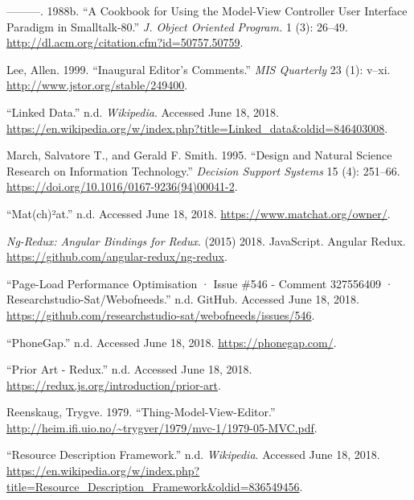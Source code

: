 \documentclass[a4paper,,tablecaptionabove]{scrbook}
\begin{document}
\leavevmode\hypertarget{ref-KrasnerCookbookUsingModelview1988}{}%
---------. 1988b. ``A Cookbook for Using the Model-View Controller User
Interface Paradigm in Smalltalk-80.'' \emph{J. Object Oriented Program.}
1 (3): 26--49. \url{http://dl.acm.org/citation.cfm?id=50757.50759}.

\leavevmode\hypertarget{ref-LeeInauguralEditorComments1999}{}%
Lee, Allen. 1999. ``Inaugural Editor's Comments.'' \emph{MIS Quarterly}
23 (1): v--xi. \url{http://www.jstor.org/stable/249400}.

\leavevmode\hypertarget{ref-Linkeddata}{}%
``Linked Data.'' n.d. \emph{Wikipedia}. Accessed June 18, 2018.
\url{https://en.wikipedia.org/w/index.php?title=Linked_data\&oldid=846403008}.

\leavevmode\hypertarget{ref-MarchDesignnaturalscience1995}{}%
March, Salvatore T., and Gerald F. Smith. 1995. ``Design and Natural
Science Research on Information Technology.'' \emph{Decision Support
Systems} 15 (4): 251--66.
\url{https://doi.org/10.1016/0167-9236(94)00041-2}.

\leavevmode\hypertarget{ref-Match}{}%
``Mat(ch)²at.'' n.d. Accessed June 18, 2018.
\url{https://www.matchat.org/owner/}.

\leavevmode\hypertarget{ref-ngreduxAngularbindings2018}{}%
\emph{Ng-Redux: Angular Bindings for Redux}. (2015) 2018. JavaScript.
Angular Redux. \url{https://github.com/angular-redux/ng-redux}.

\leavevmode\hypertarget{ref-Pageloadperformanceoptimisation}{}%
``Page-Load Performance Optimisation · Issue \#546 - Comment 327556409 ·
Researchstudio-Sat/Webofneeds.'' n.d. GitHub. Accessed June 18, 2018.
\url{https://github.com/researchstudio-sat/webofneeds/issues/546}.

\leavevmode\hypertarget{ref-PhoneGap}{}%
``PhoneGap.'' n.d. Accessed June 18, 2018. \url{https://phonegap.com/}.

\leavevmode\hypertarget{ref-PriorArtRedux}{}%
``Prior Art - Redux.'' n.d. Accessed June 18, 2018.
\url{https://redux.js.org/introduction/prior-art}.

\leavevmode\hypertarget{ref-ReenskaugThingModelViewEditor1979}{}%
Reenskaug, Trygve. 1979. ``Thing-Model-View-Editor.''
\url{http://heim.ifi.uio.no/~trygver/1979/mvc-1/1979-05-MVC.pdf}.

\leavevmode\hypertarget{ref-ResourceDescriptionFramework}{}%
``Resource Description Framework.'' n.d. \emph{Wikipedia}. Accessed June
18, 2018.
\url{https://en.wikipedia.org/w/index.php?title=Resource_Description_Framework\&oldid=836549456}.
\end{document}
